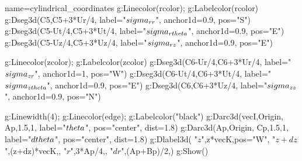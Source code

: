 \documentclass[border=5pt]{standalone}%
\begin{document}
\begin{luadraw}{name=cylindrical_coordinates}
g:Linecolor(rcolor); g:Labelcolor(rcolor)
g:Dseg3d({C5,C5+3*Ur/4}, {label="$\\sigma_{r r}$", anchor1d=0.9, pos="S"})
g:Dseg3d({C5-Ut/4,C5+3*Ut/4}, {label="$\\sigma_{r \\theta}$", anchor1d=0.9, pos="E"})
g:Dseg3d({C5-Uz/4,C5+3*Uz/4}, {label="$\\sigma_{r z}$", anchor1d=0.9, pos="E"})

g:Linecolor(zcolor); g:Labelcolor(zcolor)
g:Dseg3d({C6-Ur/4,C6+3*Ur/4}, {label="$\\sigma_{z r}$", anchor1d=1, pos="W"})
g:Dseg3d({C6-Ut/4,C6+3*Ut/4}, {label="$\\sigma_{z \\theta}$", anchor1d=0.9, pos="E"})
g:Dseg3d({C6,C6+3*Uz/4}, {label="$\\sigma_{z z}$", anchor1d=0.9, pos="N"})

g:Linewidth(4); g:Linecolor(edge); g:Labelcolor("black")
g:Darc3d(vecI,Origin, Ap,1.5,1, {label="$\\theta$", pos="center", dist=1.8})
g:Darc3d(Ap,Origin, Cp,1.5,1, {label="$d\\theta$", pos="center", dist=1.8})
g:Dlabel3d( "$z$",z*vecK,{pos="W"}, "$z+dz$",(z+dz)*vecK,{}, "$r$",3*Ap/4,{}, "$dr$",(Ap+Bp)/2,{})
g:Show()
\end{luadraw}
\end{document}
